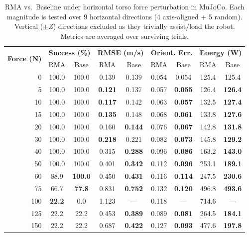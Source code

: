 \begin{table}[H]
\centering
\renewcommand{\arraystretch}{1.15}
\caption{RMA vs.\ Baseline under horizontal torso force perturbation in MuJoCo. Each magnitude is tested over 9 horizontal directions (4 axis-aligned + 5 random). Vertical ($\pm Z$) directions excluded as they trivially assist/load the robot. Metrics are averaged over surviving trials.}
\label{tab:rma_horizontal}
\begin{tabularx}{\textwidth}{r|cc|cc|cc|cc}
\toprule
\multirow{2}{*}{\textbf{Force (N)}} & \multicolumn{2}{c|}{\textbf{Success (\%)}} & \multicolumn{2}{c|}{\textbf{RMSE (m/s)}} & \multicolumn{2}{c|}{\textbf{Orient. Err.}} & \multicolumn{2}{c}{\textbf{Energy (W)}} \\
& RMA & Base & RMA & Base & RMA & Base & RMA & Base \\
\midrule
0 & 100.0 & 100.0 & 0.139 & 0.139 & 0.054 & 0.054 & 125.4 & 125.4 \\
5 & 100.0 & 100.0 & \textbf{0.121} & 0.137 & 0.057 & \textbf{0.055} & 126.4 & \textbf{126.4} \\
10 & 100.0 & 100.0 & \textbf{0.117} & 0.142 & 0.063 & \textbf{0.057} & 132.5 & \textbf{127.4} \\
15 & 100.0 & 100.0 & \textbf{0.135} & 0.148 & 0.068 & \textbf{0.061} & 133.8 & \textbf{127.6} \\
20 & 100.0 & 100.0 & 0.160 & \textbf{0.144} & 0.076 & \textbf{0.067} & 142.8 & \textbf{131.8} \\
30 & 100.0 & 100.0 & \textbf{0.218} & 0.221 & 0.082 & \textbf{0.073} & 145.8 & \textbf{129.2} \\
40 & 100.0 & 100.0 & 0.315 & \textbf{0.288} & 0.096 & \textbf{0.086} & 163.2 & \textbf{143.0} \\
50 & 100.0 & 100.0 & 0.401 & \textbf{0.342} & 0.112 & \textbf{0.096} & 253.1 & \textbf{189.1} \\
60 & 88.9 & \textbf{100.0} & 0.450 & \textbf{0.431} & 0.116 & \textbf{0.114} & 247.5 & \textbf{230.6} \\
75 & 66.7 & \textbf{77.8} & 0.831 & \textbf{0.752} & 0.132 & \textbf{0.120} & 496.8 & \textbf{493.6} \\
100 & \textbf{22.2} & 0.0 & 1.123 & --- & 0.118 & --- & 714.6 & --- \\
125 & 22.2 & 22.2 & 0.453 & \textbf{0.389} & 0.089 & \textbf{0.081} & 264.5 & \textbf{184.1} \\
150 & 22.2 & 22.2 & 0.687 & \textbf{0.422} & 0.127 & \textbf{0.093} & 477.6 & \textbf{197.8} \\
\bottomrule
\end{tabularx}
\end{table}